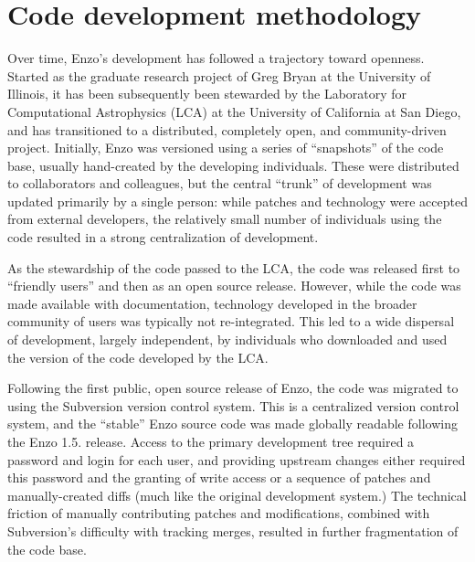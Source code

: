 
\section{Code development methodology}

Over time, Enzo's development has followed a trajectory toward openness.
Started as the graduate research project of Greg Bryan at the University of
Illinois, it has been subsequently been stewarded by the Laboratory for
Computational Astrophysics (LCA) at the University of California at San Diego,
and has transitioned to a distributed, completely open, and community-driven
project.  Initially, Enzo was versioned using a series of ``snapshots'' of the
code base, usually hand-created by the developing individuals.  These were
distributed to collaborators and colleagues, but the central ``trunk'' of
development was updated primarily by a single person: while patches and
technology were accepted from external developers, the relatively small number
of individuals using the code resulted in a strong centralization of
development.

As the stewardship of the code passed to the LCA, the code was released first
to ``friendly users'' and then as an open source release.  However, while the
code was made available with documentation, technology developed in the broader
community of users was typically not re-integrated.  This led to a wide
dispersal of development, largely independent, by individuals who downloaded
and used the version of the code developed by the LCA.

Following the first public, open source release of Enzo, the code was migrated
to using the Subversion version control system.  This is a centralized version
control system, and the ``stable'' Enzo source code was made globally readable
following the Enzo 1.5. release.  Access to the primary development tree
required a password and login for each user, and providing upstream changes
either required this password and the granting of write access or a sequence of
patches and manually-created diffs (much like the original development system.)
The technical friction of manually contributing patches and modifications,
combined with Subversion's difficulty with tracking merges, resulted in further
fragmentation of the code base.

